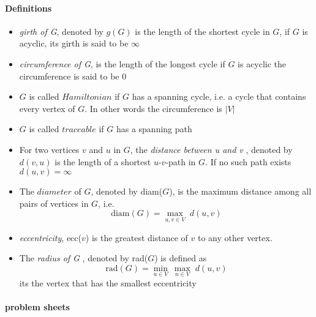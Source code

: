 \paragraph{Definitions} 
\begin{itemize}
    \item \textit{girth of G}, denoted by $ g(G) $ is the length of the shortest cycle
    in $ G $, if $ G $ is acyclic, its girth is said to be $ \infty $
    \item \textit{circumference of G}, is the length of the longest cycle
    if $ G $ is acyclic the circumference is said to be $0$
    \item $ G $ is called $ Hamiltonian $ if $ G $ has a spanning cycle, i.e. 
    a cycle that contains every vertex of $ G $. In other words the circumference is 
    $ |V|$
    \item $ G $ is called $ traceable $ if $ G $ has a spanning path
    \item For two vertices $ v $ and $ u $ in $ G $, the 
    \textit{distance between u and v }, denoted by $ d(v,u) $ is the length of 
    a shortest $u$-$v$-path in $ G $. If no such path exists $ d(u,v) = \infty $
    \item The $ diameter $ of $ G $, denoted by diam($G$), is the maximum distance 
    among all pairs of vertices in $ G $, i.e.
    $$ \text{diam}(G) = \underset{u,v \in V}{\max} \; d(u,v)$$
    \item \textit{eccentricity}, ecc($v$) is the greatest distance of $ v $ to any 
    other vertex.
    \item The \textit{radius of G }, denoted by rad($G$) is defined as 
    $$ \text{rad}(G) =  \underset{u \in V}{\min} \: \underset{n \in V}{\max} \;d(u,v) $$
    its the vertex that has the smallest eccentricity 

\end{itemize}

\paragraph{problem sheets}
